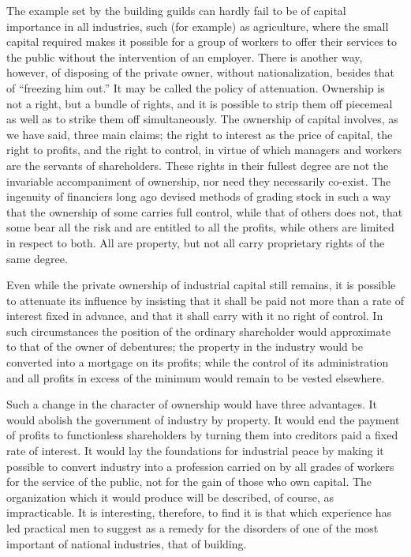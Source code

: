 \documentclass{book}
\begin{document}
The example set by the building guilds can hardly fail to be of capital importance in all industries, such (for example) as agriculture, where the small capital required makes it possible for a group of workers to offer their services to the public without the intervention of an employer. There is another way, however, of disposing of the private owner, without nationalization, besides that of “freezing him out.” It may be called the policy of attenuation. Ownership is not a right, but a bundle of rights, and it is possible to strip them off piecemeal as well as to strike them off simultaneously. The ownership of capital involves, as we have said, three main claims; the right to interest as the price of capital, the right to profits, and the right to control, in virtue of which managers and workers are the servants of shareholders. These rights in their fullest degree are not the invariable accompaniment of ownership, nor need they necessarily co-exist. The ingenuity of financiers long ago devised methods of grading stock in such a way that the ownership of some carries full control, while that of others does not, that some bear all the risk and are entitled to all the profits, while others are limited in respect to both. All are property, but not all carry proprietary rights of the same degree.

Even while the private ownership of industrial capital still remains, it is possible to attenuate its influence by insisting that it shall be paid not more than a rate of interest fixed in advance, and that it shall carry with it no right of control. In such circumstances the position of the ordinary shareholder would approximate to that of the owner of debentures; the property in the industry would be converted into a mortgage on its profits; while the control of its administration and all profits in excess of the minimum would remain to be vested elsewhere.

Such a change in the character of ownership would have three advantages. It would abolish the government of industry by property. It would end the payment of profits to functionless shareholders by turning them into creditors paid a fixed rate of interest. It would lay the foundations for industrial peace by making it possible to convert industry into a profession carried on by all grades of workers for the service of the public, not for the gain of those who own capital. The organization which it would produce will be described, of course, as impracticable. It is interesting, therefore, to find it is that which experience has led practical men to suggest as a remedy for the disorders of one of the most important of national industries, that of building.
\end{document}
